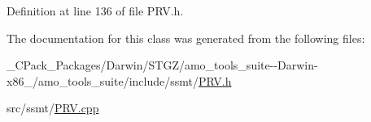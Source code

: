 Definition at line 136 of file P\+R\+V.\+h.



The documentation for this class was generated from the following files\+:\begin{DoxyCompactItemize}
\item 
\+\_\+\+C\+Pack\+\_\+\+Packages/\+Darwin/\+S\+T\+G\+Z/amo\+\_\+tools\+\_\+suite-\/-\/\+Darwin-\/x86\+\_/amo\+\_\+tools\+\_\+suite/include/ssmt/\hyperlink{___c_pack___packages_2_darwin_2_s_t_g_z_2amo__tools__suite--_darwin-x86__64_2amo__tools__suite_2include_2ssmt_2_p_r_v_8h}{P\+R\+V.\+h}\item 
src/ssmt/\hyperlink{_p_r_v_8cpp}{P\+R\+V.\+cpp}\end{DoxyCompactItemize}
